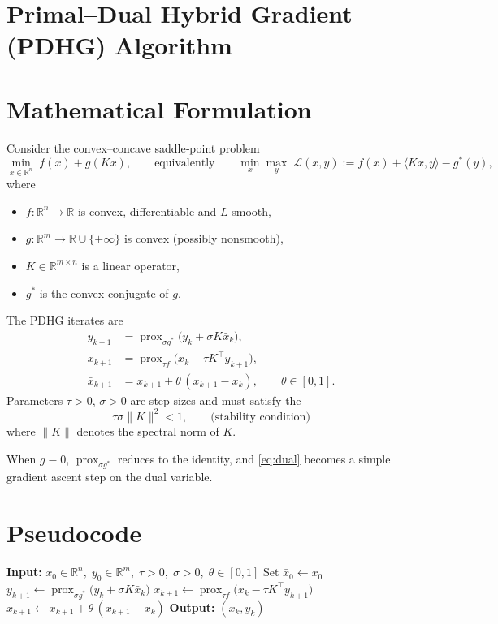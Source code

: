 \documentclass{article}
\newcommand{\prox}{\operatorname{prox}}
\newcommand{\inner}[2]{\langle #1,#2\rangle}
\begin{document}
\section*{Primal–Dual Hybrid Gradient (PDHG) Algorithm}

\section*{Mathematical Formulation}
Consider the convex–concave saddle‑point problem
\[
\min_{x\in\mathbb R^{n}} \; f(x)+g(Kx),
\qquad 
\text{equivalently}\qquad 
\min_{x}\max_{y}\; \mathcal L(x,y):=f(x)+\inner{Kx}{y}-g^{*}(y),
\]
where 
\begin{itemize}
  \item $f:\mathbb R^{n}\to\mathbb R$ is convex, differentiable and $L$‑smooth,
  \item $g:\mathbb R^{m}\to\mathbb R\cup\{+\infty\}$ is convex (possibly nonsmooth),
  \item $K\in\mathbb R^{m\times n}$ is a linear operator,
  \item $g^{*}$ is the convex conjugate of $g$.
\end{itemize}
The PDHG iterates are
\begin{align}
y_{k+1}&=\prox_{\sigma g^{*}}\!\bigl(y_{k}+\sigma K\bar x_{k}\bigr), \label{eq:dual}\\[4pt]
x_{k+1}&=\prox_{\tau f}\!\bigl(x_{k}-\tau K^{\top}y_{k+1}\bigr), \label{eq:primal}\\[4pt]
\bar x_{k+1}&=x_{k+1}+\theta\,(x_{k+1}-x_{k}), \qquad \theta\in[0,1]. \label{eq:extrap}
\end{align}
Parameters $\tau>0$, $\sigma>0$ are step sizes and must satisfy the
\[
\tau\sigma\|K\|^{2}<1, \qquad\text{(stability condition)} \tag{C1}
\]
where $\|K\|$ denotes the spectral norm of $K$.

When $g\equiv0$, $\prox_{\sigma g^{*}}$ reduces to the identity, and
\eqref{eq:dual} becomes a simple gradient ascent step on the dual variable.

\section*{Pseudocode}
\begin{algorithm}[H]
\caption{Primal–Dual Hybrid Gradient (PDHG)}\label{alg:pdhg}
\begin{algorithmic}[1]
\STATE \textbf{Input:} $x_{0}\in\mathbb R^{n},\;y_{0}\in\mathbb R^{m},\;\tau>0,\;\sigma>0,\;\theta\in[0,1]$
\STATE Set $\bar x_{0}\gets x_{0}$
    \STATE $y_{k+1}\gets \prox_{\sigma g^{*}}\!\bigl(y_{k}+\sigma K\bar x_{k}\bigr)$   
    \STATE $x_{k+1}\gets \prox_{\tau f}\!\bigl(x_{k}-\tau K^{\top}y_{k+1}\bigr)$      
    \STATE $\bar x_{k+1}\gets x_{k+1}+\theta\,(x_{k+1}-x_{k})$                         
\ENDFOR
\STATE \textbf{Output:} $(x_{k},y_{k})$
\end{algorithmic}
\end{algorithm}
\end{document}
